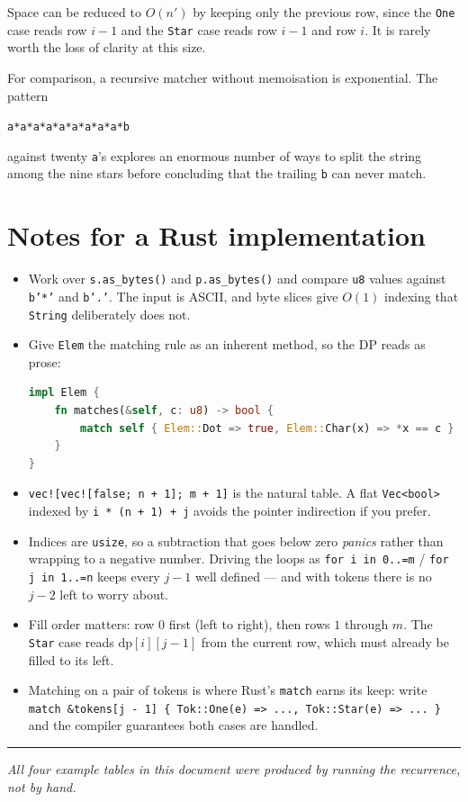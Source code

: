 \documentclass[11pt,a4paper]{article}
\begin{document}
Space can be reduced to $O(n')$ by keeping only the previous row, since the \texttt{One} case reads
row $i-1$ and the \texttt{Star} case reads row $i-1$ and row $i$. It is rarely worth the loss of
clarity at this size.

For comparison, a recursive matcher without memoisation is exponential. The pattern

\begin{center}
\texttt{a*a*a*a*a*a*a*a*a*b}
\end{center}

\noindent
against twenty \texttt{a}'s explores an enormous number of ways to split the string among the nine
stars before concluding that the trailing \texttt{b} can never match.

\section{Notes for a Rust implementation}

\begin{itemize}
  \item Work over \texttt{s.as\_bytes()} and \texttt{p.as\_bytes()} and compare \texttt{u8} values
        against \texttt{b'*'} and \texttt{b'.'}. The input is ASCII, and byte slices give $O(1)$
        indexing that \texttt{String} deliberately does not.
  \item Give \texttt{Elem} the matching rule as an inherent method, so the DP reads as prose:
\begin{lstlisting}[language=Rust]
impl Elem {
    fn matches(&self, c: u8) -> bool {
        match self { Elem::Dot => true, Elem::Char(x) => *x == c }
    }
}
\end{lstlisting}
  \item \texttt{vec![vec![false; n + 1]; m + 1]} is the natural table. A flat \texttt{Vec<bool>}
        indexed by \texttt{i * (n + 1) + j} avoids the pointer indirection if you prefer.
  \item Indices are \texttt{usize}, so a subtraction that goes below zero \emph{panics} rather than
        wrapping to a negative number. Driving the loops as \texttt{for i in 0..=m} /
        \texttt{for j in 1..=n} keeps every $j-1$ well defined --- and with tokens there is no
        $j-2$ left to worry about.
  \item Fill order matters: row $0$ first (left to right), then rows $1$ through $m$. The
        \texttt{Star} case reads $\mathrm{dp}[i][j-1]$ from the current row, which must already be
        filled to its left.
  \item Matching on a pair of tokens is where Rust's \texttt{match} earns its keep: write
        \texttt{match \&tokens[j - 1] \{ Tok::One(e) => ..., Tok::Star(e) => ... \}} and the
        compiler guarantees both cases are handled.
\end{itemize}

\vspace{6pt}
\hrule
\vspace{4pt}
\begin{center}\small
  \textit{All four example tables in this document were produced by running the recurrence, not by hand.}
\end{center}
\end{document}
